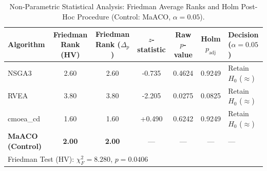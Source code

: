 \begin{table}[htbp]
\caption{Non-Parametric Statistical Analysis: Friedman Average Ranks and Holm Post-Hoc Procedure (Control: MaACO, $\alpha = 0.05$).}
\label{tab:friedman_holm}
\centering\small
\begin{tabular}{@{}l c c c c c l@{}}
\toprule
Algorithm & Friedman Rank (HV) & Friedman Rank ($\Delta_p$) & $z$-statistic & Raw $p$-value & Holm $p_{\text{adj}}$ & Decision ($\alpha=0.05$) \\
\midrule
NSGA3 & 2.60 & 2.60 & -0.735 & 0.4624 & 0.9249 & Retain $H_0$ ($\approx$) \\
RVEA & 3.80 & 3.80 & -2.205 & 0.0275 & 0.0825 & Retain $H_0$ ($\approx$) \\
cmoea_cd & 1.60 & 1.60 & +0.490 & 0.6242 & 0.9249 & Retain $H_0$ ($\approx$) \\
\textbf{MaACO (Control)} & \textbf{2.00} & \textbf{2.00} & --- & --- & --- & --- \\
\midrule
\multicolumn{7}{l}{Friedman Test (HV): $\chi_F^2 = 8.280$, $p = 0.0406$} \\
\bottomrule
\end{tabular}
\end{table}
